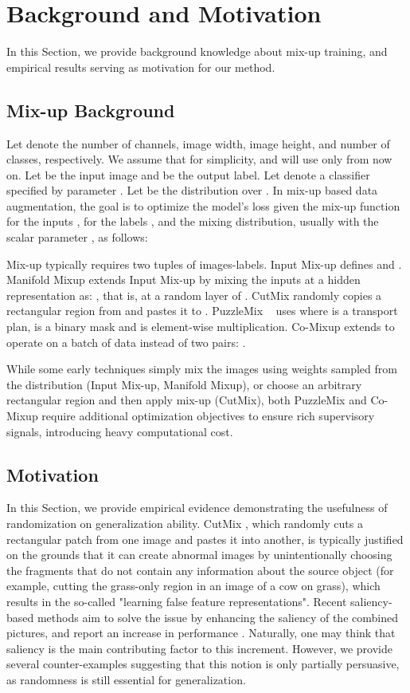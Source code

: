 \documentclass[letterpaper]{article} \usepackage[submission]{aaai23}  \usepackage{times}  \usepackage{helvet}  \usepackage{courier}  \usepackage[hyphens]{url}  \usepackage{graphicx} \urlstyle{rm} \def\UrlFont{\rm}  \usepackage{natbib}  \usepackage{caption} \frenchspacing  \setlength{\pdfpagewidth}{8.5in} \setlength{\pdfpageheight}{11in}
\newcommand{\mixup}{Input Mix-up}
\newcommand{\cutmix}{{CutMix}}
\newcommand{\puzzlemix}{{PuzzleMix}}
\newcommand{\comixup}{{Co-Mixup}}
\newcommand{\manifoldmixup}{{Manifold Mixup}}
\begin{document}
\section{Background and Motivation}
\label{sec:background}
In this Section, we provide background knowledge about mix-up training, and empirical results serving as motivation for our method.
\subsection{Mix-up Background}
Let  denote the number of channels, image width, image height, and number of classes, respectively. We assume that  for simplicity, and will use only  from now on. Let  be the input image and  be the output label. Let  denote a classifier specified by parameter . Let  be the distribution over . In mix-up based data augmentation, the goal is to optimize the model's loss  given the mix-up function for the inputs , for the labels , and the mixing distribution, usually  with the scalar parameter , as follows:



Mix-up typically requires two tuples of images-labels. \mixup{} \cite{zhang2018mixup} defines  and . \manifoldmixup{} \cite{verma2019manifold} extends \mixup{} by mixing the inputs at a hidden representation  as: , that is, at a random layer of . \cutmix{} randomly copies a rectangular region from  and pastes it to . \puzzlemix{} ~\cite{kim2020puzzlemix} uses  where  is a transport plan,  is a binary mask and  is element-wise multiplication. \comixup{} \cite{kim2021comixup} extends  to operate on a batch of data instead of two pairs: . 

While some early techniques simply mix the images using weights sampled from the  distribution (\mixup{}, \manifoldmixup{}), or choose an arbitrary rectangular region and then apply mix-up (\cutmix{}), both \puzzlemix{} and \comixup{} require additional optimization objectives to ensure rich supervisory signals, introducing heavy computational cost.


\subsection{Motivation}
\label{sec:motivation}
In this Section, we provide empirical evidence demonstrating the usefulness of randomization on generalization ability. \cutmix{} \cite{yun2019cutmix}, which randomly cuts a rectangular patch from one image and pastes it into another, is typically justified on the grounds that it can create abnormal images by unintentionally choosing the fragments that do not contain any information about the source object (for example, cutting the grass-only region in an image of a cow on grass), which results in the so-called "learning false feature representations". Recent saliency-based methods aim to solve the issue by enhancing the saliency of the combined pictures, and report an increase in performance \cite{uddin2021saliencymix,kim2020puzzlemix,mixup9,kim2021comixup}. Naturally, one may think that saliency is the main contributing factor to this increment. However, we provide several counter-examples suggesting that this notion is only partially persuasive, as randomness is still essential for generalization.
\end{document}
